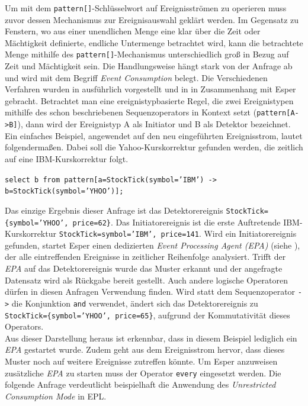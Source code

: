 \documentclass{acm_proc_article-sp}
\begin{document}
Um mit dem \texttt{pattern[]}-Schlüsselwort auf Ereignisströmen zu operieren muss zuvor 
dessen Mechanismus zur Ereignisauswahl geklärt werden. Im Gegensatz zu Fenstern, wo aus 
einer unendlichen Menge eine klar über die Zeit oder Mächtigkeit definierte, endliche 
Untermenge betrachtet wird, kann die betrachtete Menge mithilfe des 
\texttt{pattern[]}-Mechanismus unterschiedlich groß in Bezug auf Zeit und Mächtigkeit 
sein. Die Handlungsweise hängt stark von der Anfrage ab und wird mit dem Begriff  
\textit{Event Consumption} belegt. Die Verschiedenen Verfahren wurden in 
\cite{adaikkalavan} ausführlich vorgestellt und in \cite{hedtstuck} in Zusammenhang mit 
Esper gebracht. Betrachtet man eine ereignistypbasierte Regel, die zwei Ereignistypen 
mithilfe des schon beschriebenen Sequenzoperators in Kontext setzt 
(\texttt{pattern[A->B]}), dann wird der Ereignistyp A als Initiator und B als Detektor 
bezeichnet. Ein einfaches Beispiel, angewendet auf den neu eingeführten Ereignisstrom, 
lautet folgendermaßen. Dabei soll die Yahoo-Kurskorrektur gefunden werden, die zeitlich 
auf eine IBM-Kurskorrektur folgt.

\texttt{select b from pattern[a=StockTick(symbol='IBM') ->\\ 
b=StockTick(symbol='YHOO')];}

Das einzige Ergebnis dieser Anfrage ist das Detektorereignis 
\texttt{StockTick=\{symbol='YHOO', price=62\}}. Das Initiatorereignis ist die erste 
Auftretende IBM-Kurskorrektur \texttt{StockTick={symbol='IBM', price=141}}. Wird ein 
Initiatorereignis gefunden, startet Esper einen dedizierten \textit{Event Processing 
Agent (EPA)} (siehe \cite{bruns}), der alle eintreffenden Ereignisse in zeitlicher 
Reihenfolge analysiert. Trifft der \textit{EPA} auf das Detektorereignis wurde das Muster 
erkannt und der angefragte Datensatz wird als Rückgabe bereit gestellt. Auch andere 
logische Operatoren dürfen in diesen Anfragen Verwendung finden. Wird statt dem 
Sequenzoperator \texttt{->} die Konjunktion \texttt{and} verwendet, ändert sich das 
Detektorereignis zu \texttt{StockTick=\{symbol='YHOO', price=65\}}, aufgrund der 
Kommutativität dieses Operators.\\
Aus dieser Darstellung heraus ist erkennbar, dass in diesem Beispiel lediglich ein 
\textit{EPA} gestartet wurde. Zudem geht aus dem Ereignisstrom hervor, dass dieses Muster 
noch auf weitere Ereignisse zutreffen könnte. Um Esper anzuweisen zusätzliche 
\textit{EPA} zu starten muss der Operator \texttt{every} eingesetzt werden. Die folgende 
Anfrage verdeutlicht beispielhaft die Anwendung des 
\textit{Unrestricted Consumption Mode} in EPL.
\end{document}
